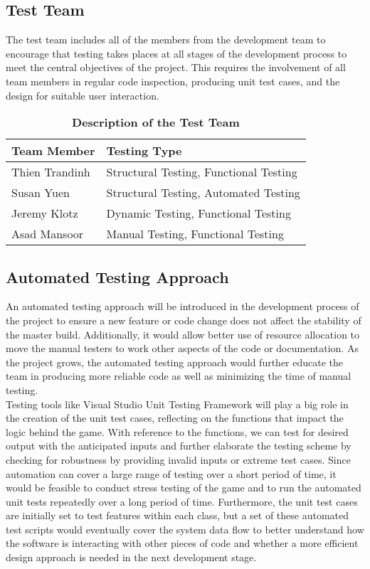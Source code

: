 \documentclass{article}
\begin{document}
\subsection{Test Team}

The test team includes all of the members from the development team to encourage that testing takes places at all stages of the development process to meet the central objectives of the project. This requires the involvement of all team members in regular code inspection, producing unit test cases, and the design for suitable user interaction.

\begin{table}[h]
\caption{\textbf{Description of the Test Team}}
\begin{tabularx}{\textwidth}{lX}
    \toprule
    \textbf{Team Member} & \textbf{Testing Type} \\
    \midrule
    Thien Trandinh & Structural Testing, Functional Testing \\
    Susan Yuen & Structural Testing, Automated Testing \\
    Jeremy Klotz & Dynamic Testing, Functional Testing \\
    Asad Mansoor & Manual Testing, Functional Testing \\
    \bottomrule
\end{tabularx}
\end{table}

\subsection{Automated Testing Approach}

An automated testing approach will be introduced in the development process of the project to ensure a new feature or code change does not affect the stability of the master build. Additionally, it would allow better use of resource allocation to move the manual testers to work other aspects of the code or documentation. As the project grows, the automated testing approach would further educate the team in producing more reliable code as well as minimizing the time of manual testing. \\

\noindent
Testing tools like Visual Studio Unit Testing Framework will play a big role in the creation of the unit test cases, reflecting on the functions that impact the logic behind the game. With reference to the functions, we can test for desired output with the anticipated inputs and further elaborate the testing scheme by checking for robustness by providing invalid inputs or extreme test cases. Since automation can cover a large range of testing over a short period of time, it would be feasible to conduct stress testing of the game and to run the automated unit tests repeatedly over a long period of time. Furthermore, the unit test cases are initially set to test features within each class, but a set of these automated test scripts would eventually cover the system data flow to better understand how the software is interacting with other pieces of code and whether a more efficient design approach is needed in the next development stage. \\
\end{document}
